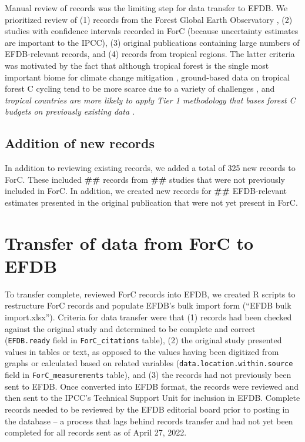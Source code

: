 \documentclass[, manuscript]{copernicus}
\begin{document}
Manual review of records was the limiting step for data transfer to
EFDB. We prioritized review of (1) records from the Forest Global Earth
Observatory
\citep[ForestGEO,][]{anderson-teixeira_ctfsforestgeo_2015, davies_forestgeo_2021},
(2) studies with confidence intervals recorded in ForC (because
uncertainty estimates are important to the IPCC), (3) original
publications containing large numbers of EFDB-relevant records, and (4)
records from tropical regions. The latter criteria was motivated by the
fact that although tropical forest is the single most important biome
for climate change mitigation \citep{refs}, ground-based data on
tropical forest C cycling tend to be more scarce due to a variety of
challenges \citep{delima_making_2022}, and \emph{tropical countries are
more likely to apply Tier 1 methodology that bases forest C budgets on
previously existing data \citep{ref}.}

\subsection{Addition of new records}

In addition to reviewing existing records, we added a total of 325 new
records to ForC. These included \textbf{\#\#} records from \textbf{\#\#}
studies \citep{piponiot_distribution_2022, refs} that were not
previously included in ForC. In addition, we created new records for
\textbf{\#\#} EFDB-relevant estimates presented in the original
publication that were not yet present in ForC.

\section{Transfer of data from ForC to EFDB}

To transfer complete, reviewed ForC records into EFDB, we created R
scripts to restructure ForC records and populate EFDB's bulk import form
(``EFDB bulk import.xlsx''). Criteria for data transfer were that (1)
records had been checked against the original study and determined to be
complete and correct (\texttt{EFDB.ready} field in
\texttt{ForC\_citations} table), (2) the original study presented values
in tables or text, as opposed to the values having been digitized from
graphs or calculated based on related variables
(\texttt{data.location.within.source} field in
\texttt{ForC\_measurements} table), and (3) the records had not
previously been sent to EFDB. Once converted into EFDB format, the
records were reviewed and then sent to the IPCC's Technical Support Unit
for inclusion in EFDB. Complete records needed to be reviewed by the
EFDB editorial board prior to posting in the database -- a process that
lags behind records transfer and had not yet been completed for all
records sent as of April 27, 2022.
\end{document}
